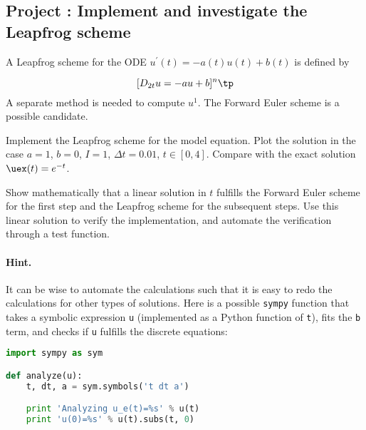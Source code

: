 \documentclass[graybox,sectrefs,envcountresetchap,open=right,final]{svmonodo}
\newenvironment{doconceexercise}{}{}
\newcounter{doconceexercisecounter}
\begin{document}
\begin{doconceexercise}

\subsection*{Project \thedoconceexercisecounter: Implement and investigate the Leapfrog scheme}

\label{decay:fd2:exer:leapfrog1}

A Leapfrog scheme
for the ODE $u^{\prime}(t) = -a(t)u(t) + b(t)$ is defined by

\begin{equation}
\lbrack D_{2t}u = -au+b\rbrack^n\tp
\label{decay:fd2:exer:leapfrog1:scheme}
\end{equation}
A separate method is needed to compute $u^1$. The Forward Euler
scheme is a possible candidate.


Implement the Leapfrog scheme for the model equation.
Plot the solution in the case $a=1$, $b=0$, $I=1$,
$\Delta t = 0.01$, $t\in [0,4]$. Compare with the exact
solution $\uex(t)=e^{-t}$.

Show mathematically that a linear solution in $t$ fulfills the
Forward Euler scheme for the first step and the Leapfrog scheme
for the subsequent steps. Use this linear solution to verify
the implementation, and automate the verification through a test
function.


\paragraph{Hint.}
It can be wise to automate the calculations such that it is easy to
redo the calculations for other types of solutions. Here is
a possible \texttt{sympy} function that takes a symbolic expression \texttt{u}
(implemented as a Python function of \texttt{t}), fits the \texttt{b} term, and
checks if \texttt{u} fulfills the discrete equations:

\begin{lstlisting}[language=Python,style=blue1_bluegreen]
import sympy as sym

def analyze(u):
    t, dt, a = sym.symbols('t dt a')

    print 'Analyzing u_e(t)=%s' % u(t)
    print 'u(0)=%s' % u(t).subs(t, 0)


\end{lstlisting}
\end{doconceexercise}
\end{document}
